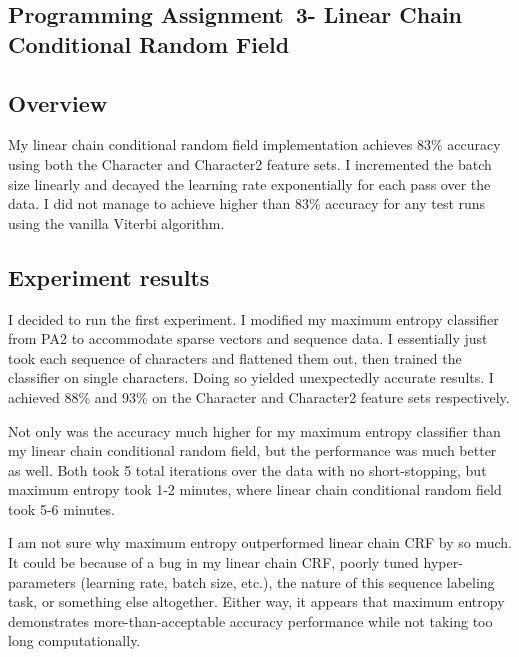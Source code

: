 
\renewcommand{\studentName}{Kahlil Oppenheimer}
\renewcommand{\courseNumber}{COSI 134a}
\renewcommand{\courseTitle}{Statistical Approaches to Natural Language Processing}

\renewcommand{\assignmentType}{Programming Assignment}
\renewcommand{\assignmentNum}{3}
\renewcommand{\assignmentDueDate}{November 17, 2015}



\begin{center}\section*{\assignmentType\ \assignmentNum - Linear Chain Conditional Random Field}\end{center}	

\subsection*{Overview}

My linear chain conditional random field implementation achieves 83\% accuracy using both the Character and Character2 feature sets. I incremented the batch size linearly and decayed the learning rate exponentially for each pass over the data. I did not manage to achieve higher than 83\% accuracy for any test runs using the vanilla Viterbi algorithm.

\subsection*{Experiment results}

I decided to run the first experiment. I modified my maximum entropy classifier from PA2 to accommodate sparse vectors and sequence data. I essentially just took each sequence of characters and flattened them out, then trained the classifier on single characters. Doing so yielded unexpectedly accurate results. I achieved 88\% and 93\% on the Character and Character2 feature sets respectively.

Not only was the accuracy much higher for my maximum entropy classifier than my linear chain conditional random field, but the performance was much better as well. Both took 5 total iterations over the data with no short-stopping, but maximum entropy took 1-2 minutes, where linear chain conditional random field took 5-6 minutes.

I am not sure why maximum entropy outperformed linear chain CRF by so much. It could be because of a bug in my linear chain CRF, poorly tuned hyper-parameters (learning rate, batch size, etc.), the nature of this sequence labeling task, or something else altogether. Either way, it appears that maximum entropy demonstrates more-than-acceptable accuracy performance while not taking too long computationally.

